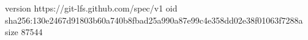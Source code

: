 version https://git-lfs.github.com/spec/v1
oid sha256:130e2467d91803b60a740b8fbad25a990a87e99c4e358dd02e38f01063f7288a
size 87544
